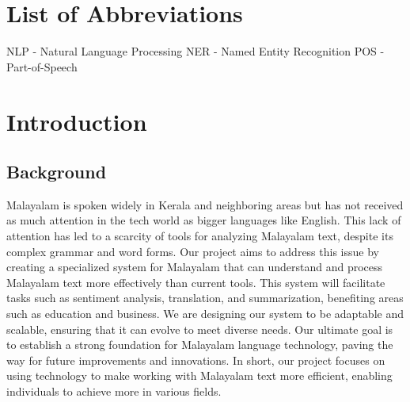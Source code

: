 \documentclass[12pt,a4paper,titlepage]{report}
\begin{document}
	
	\listoffigures
	\newpage
	
	
	\listoftables
	\newpage
	
	\chapter*{List of Abbreviations}
	
		 NLP - Natural Language Processing
		 \newline
		 NER - Named Entity Recognition
		 \newline
		 POS - Part-of-Speech
	
	
	
	
	\newpage
	
	\cleardoublepage
	
	\setcounter{page}{1}
	\chapter{Introduction}
	
	\section{Background}
	
	Malayalam is spoken widely in Kerala and neighboring areas but has not received as much attention in the tech world as bigger languages like English. This lack of attention has led to a scarcity of tools for analyzing Malayalam text, despite its complex grammar and word forms.
	\newline
	Our project aims to address this issue by creating a specialized system for Malayalam that can understand and process Malayalam text more effectively than current tools. This system will facilitate tasks such as sentiment analysis, translation, and summarization, benefiting areas such as education and business.
	\newline
	We are designing our system to be adaptable and scalable, ensuring that it can evolve to meet diverse needs. Our ultimate goal is to establish a strong foundation for Malayalam language technology, paving the way for future improvements and innovations.
	\newline
	In short, our project focuses on using technology to make working with Malayalam text more efficient, enabling individuals to achieve more in various fields.
	
\end{document}
